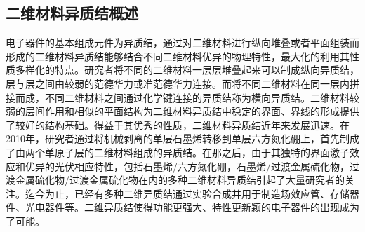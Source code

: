 \subsection{二维材料异质结概述}
电子器件的基本组成元件为异质结，通过对二维材料进行纵向堆叠或者平面组装而形成的二维材料异质结能够结合不同二维材料优异的物理特性，最大化的利用其性质多样化的特点。研究者将不同的二维材料一层层堆叠起来可以制成纵向异质结，层与层之间由较弱的范德华力或准范德华力连接。而将不同二维材料在同一层内拼接而成，不同二维材料之间通过化学键连接的异质结称为横向异质结。二维材料较弱的层间作用和相似的平面结构为二维材料异质结中稳定的界面、界线的形成提供了较好的结构基础。得益于其优秀的性质，二维材料异质结近年来发展迅速。在2010年，研究者通过将机械剥离的单层石墨烯转移到单层六方氮化硼上，首先制成了由两个单原子层的二维材料组成的异质结。在那之后，由于其独特的界面激子效应和优异的光伏相应特性，包括石墨烯/六方氮化硼，石墨烯/过渡金属硫化物，过渡金属硫化物/过渡金属硫化物在内的多种二维材料异质结引起了大量研究者的关注。迄今为止，已经有多种二维异质结通过实验合成并用于制造场效应管、存储器件、光电器件等。二维异质结使得功能更强大、特性更新颖的电子器件的出现成为了可能。

